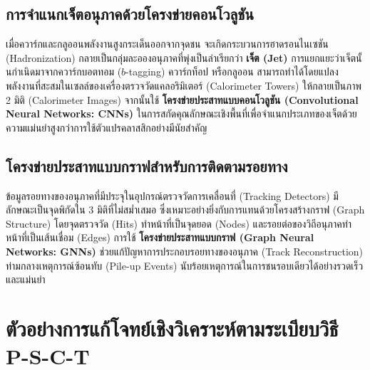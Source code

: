 \subsection{การจำแนกเจ็ตอนุภาคด้วยโครงข่ายคอนโวลูชัน}
เมื่อควาร์กและกลูออนพลังงานสูงกระเด็นออกจากจุดชน จะเกิดกระบวนการฮาดรอนไนเซชัน (Hadronization) กลายเป็นกลุ่มละอองอนุภาคที่พุ่งเป็นลำเรียกว่า \textbf{เจ็ต (Jet)} การแยกแยะว่าเจ็ตนั้นกำเนิดมาจากควาร์กบอตทอม ($b$-tagging) ควาร์กท็อป หรือกลูออน สามารถทำได้โดยแปลงพลังงานที่สะสมในเซลล์ของเครื่องตรวจวัดแคลอริมิเตอร์ (Calorimeter Towers) ให้กลายเป็นภาพ 2 มิติ (Calorimeter Images) จากนั้นใช้ \textbf{โครงข่ายประสาทแบบคอนโวลูชัน (Convolutional Neural Networks: CNNs)} ในการสกัดคุณลักษณะเชิงพื้นที่เพื่อจำแนกประเภทของเจ็ตด้วยความแม่นยำสูงกว่าการใช้ตัวแปรคลาสสิกอย่างมีนัยสำคัญ

\subsection{โครงข่ายประสาทแบบกราฟสำหรับการติดตามรอยทาง}
ข้อมูลรอยทางของอนุภาคที่มีประจุในอุปกรณ์ตรวจวัดการเคลื่อนที่ (Tracking Detectors) มีลักษณะเป็นจุดพิกัดใน 3 มิติที่ไม่สม่ำเสมอ ซึ่งเหมาะอย่างยิ่งกับการแทนด้วยโครงสร้างกราฟ (Graph Structure) โดยจุดตรวจวัด (Hits) ทำหน้าที่เป็นจุดยอด (Nodes) และรอยต่อของวิถีอนุภาคทำหน้าที่เป็นเส้นเชื่อม (Edges) การใช้ \textbf{โครงข่ายประสาทแบบกราฟ (Graph Neural Networks: GNNs)} ช่วยแก้ปัญหาการประกอบรอยทางของอนุภาค (Track Reconstruction) ท่ามกลางเหตุการณ์ซ้อนทับ (Pile-up Events) นับร้อยเหตุการณ์ในการชนรอบเดียวได้อย่างรวดเร็วและแม่นยำ

\section{ตัวอย่างการแก้โจทย์เชิงวิเคราะห์ตามระเบียบวิธี P-S-C-T}

